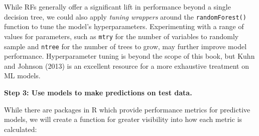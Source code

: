 \documentclass[
]{book}
\begin{document}
While RFs generally offer a significant lift in performance beyond a single decision tree, we could also apply \emph{tuning wrappers} around the \texttt{randomForest()} function to tune the model's hyperparameters. Experimenting with a range of values for parameters, such as \texttt{mtry} for the number of variables to randomly sample and \texttt{ntree} for the number of trees to grow, may further improve model performance. Hyperparameter tuning is beyond the scope of this book, but Kuhn and Johnson (2013) is an excellent resource for a more exhaustive treatment on ML models.

\textbf{Step 3: Use models to make predictions on test data.}

While there are packages in R which provide performance metrics for predictive models, we will create a function for greater visibility into how each metric is calculated:
\end{document}
